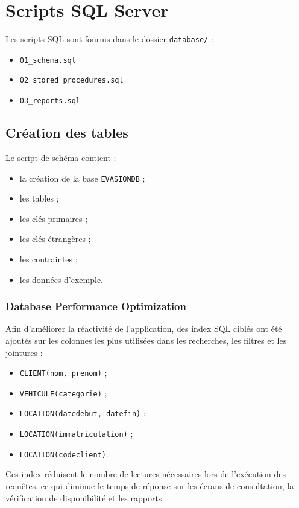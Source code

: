 \documentclass[12pt,a4paper]{report}
\begin{document}
\chapter{Scripts SQL Server}
Les scripts SQL sont fournis dans le dossier \texttt{database/} :
\begin{itemize}[leftmargin=1.2cm]
    \item \texttt{01\_schema.sql}
    \item \texttt{02\_stored\_procedures.sql}
    \item \texttt{03\_reports.sql}
\end{itemize}

\section{Création des tables}
Le script de schéma contient :
\begin{itemize}[leftmargin=1.2cm]
    \item la création de la base \texttt{EVASIONDB} ;
    \item les tables ;
    \item les clés primaires ;
    \item les clés étrangères ;
    \item les contraintes ;
    \item les données d'exemple.
\end{itemize}

\subsection{Database Performance Optimization}
Afin d'améliorer la réactivité de l'application, des index SQL ciblés ont été ajoutés sur les colonnes les plus utilisées dans les recherches, les filtres et les jointures :
\begin{itemize}[leftmargin=1.2cm]
    \item \texttt{CLIENT(nom, prenom)} ;
    \item \texttt{VEHICULE(categorie)} ;
    \item \texttt{LOCATION(datedebut, datefin)} ;
    \item \texttt{LOCATION(immatriculation)} ;
    \item \texttt{LOCATION(codeclient)}.
\end{itemize}

Ces index réduisent le nombre de lectures nécessaires lors de l'exécution des requêtes, ce qui diminue le temps de réponse sur les écrans de consultation, la vérification de disponibilité et les rapports.
\end{document}
